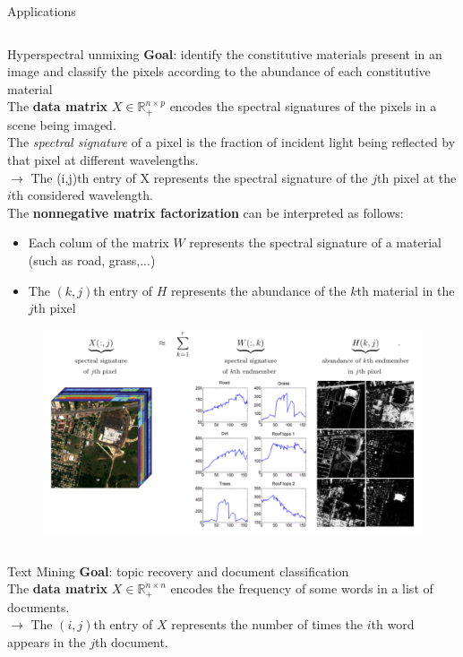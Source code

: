 \documentclass[final]{beamer}
\newlength{\onecolwid}
\newlength{\threecolwid}
\newcommand{\real}{\mathbb{R}}
\begin{document}
\begin{frame}
\begin{columns}[t]
\begin{column}{\threecolwid}
\begin{exampleblock}{Applications}
\begin{columns}[t]
\begin{column}{\onecolwid}
\begin{block}{Hyperspectral unmixing}
\textbf{Goal}: identify the constitutive materials present in an image and classify the pixels according to the abundance of each constitutive material\\
The \textbf{data matrix} $X\in\real^{n\times p}_+$ encodes the spectral signatures of the pixels in a scene being imaged.\\
The \textit{spectral signature} of a pixel is the fraction of incident light being reflected by that pixel at different wavelengths.\\
$\rightarrow$ The (i,j)th entry of X represents the spectral signature of the $j$th pixel at the $i$th considered wavelength.\\
The \textbf{nonnegative matrix factorization} can be interpreted as follows:\\
\begin{itemize}
    \item Each colum of the matrix $W$ represents the spectral signature of a material (such as road, grass,...)
    \item The $(k,j)$th entry of $H$ represents the abundance of the $k$th material in the $j$th pixel
\end{itemize}
\begin{figure}
    \centering
    \includegraphics[width=0.8\linewidth]{../images/NMF_app3.png}
\end{figure}
\end{block}
\end{column}
\end{columns}
\begin{block}{Text Mining}
\textbf{Goal}: topic recovery and document classification\\
The \textbf{data matrix} $X\in\real^{n\times n}_+$ encodes the frequency of some words in a list of documents.\\
$\rightarrow$ The $(i,j)$th entry of $X$ represents the number of times the $i$th word appears in the $j$th document.\\

\end{block}
\end{exampleblock}
\end{column}
\end{columns}
\end{frame}
\end{document}
